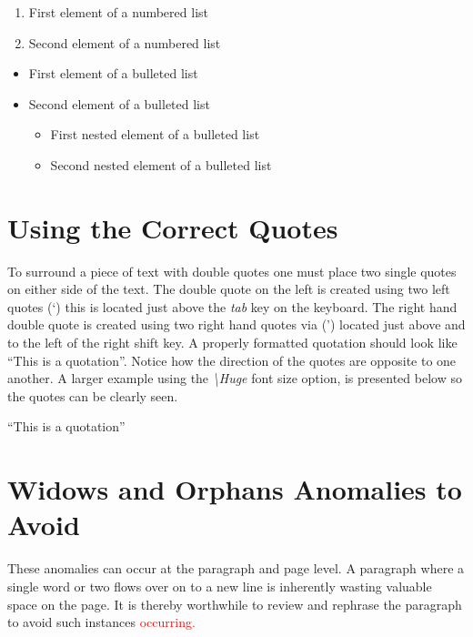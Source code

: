 {%
\begin{enumerate}
\item First element of a numbered list
\item Second element of a numbered list
\end{enumerate}
\begin{itemize}
\item First element of a bulleted list
\item Second element of a bulleted list
    \begin{itemize}
    \item First nested element of a bulleted list
    \item Second nested element of a bulleted list
    \end{itemize}
\end{itemize}
} %


\section{Using the Correct Quotes}
To surround a piece of text with double quotes one must place two single quotes on either side of the text. The double quote on the left is created using two left quotes (\lq) this is located just above the \emph{tab} key on the keyboard. The right hand double quote is created using two right hand quotes via (\rq) located just above and to the left of the right shift key. A properly formatted quotation should look like ``This is a quotation''. Notice how the direction of the quotes are opposite to one another. A larger example using the \emph{\textbackslash Huge} font size option, is presented below so the quotes can be clearly seen.

\begin{center}
\Huge{``This is a quotation''}
\end{center}

\section{Widows and Orphans Anomalies to Avoid}
These anomalies can occur at the paragraph and page level. A paragraph where a single word or two flows over on to a new line is inherently wasting valuable space on the page. It is thereby worthwhile to review and rephrase the paragraph to avoid such instances \textcolor{red}{occurring.}  

